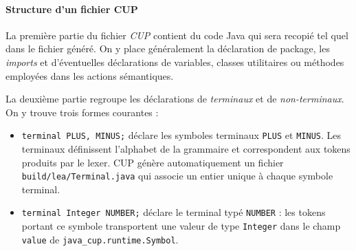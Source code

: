 \documentclass[correction]{td}
\begin{document}
\begin{exercice}
\begin{center}
  \end{center}
  
  \paragraph{Structure d'un fichier CUP}
  La première partie du fichier \emph{CUP} contient du code Java
  qui sera recopié tel quel dans le fichier généré.
  On y place généralement la déclaration de package, les \emph{imports}
  et d'éventuelles déclarations de variables, classes utilitaires
  ou méthodes employées dans les actions sémantiques.
  
  La deuxième partie regroupe les déclarations de \emph{terminaux} et de
  \emph{non-terminaux}. On y trouve trois formes courantes :
  \begin{itemize}
  \item \lstinline|terminal PLUS, MINUS;| déclare les symboles terminaux
    \lstinline|PLUS| et \lstinline|MINUS|.
    Les terminaux définissent l'alphabet de la grammaire et
    correspondent aux tokens produits par le lexer.
    CUP génère automatiquement un fichier \lstinline|build/lea/Terminal.java|
    qui associe un entier unique à chaque symbole terminal.

  \item \lstinline|terminal Integer NUMBER;| déclare le terminal typé
    \lstinline|NUMBER| : les tokens portant ce symbole transportent
    une valeur de type \lstinline|Integer| dans le champ \lstinline|value|
    de \lstinline|java_cup.runtime.Symbol|.


\end{itemize}
\end{exercice}
\end{document}
